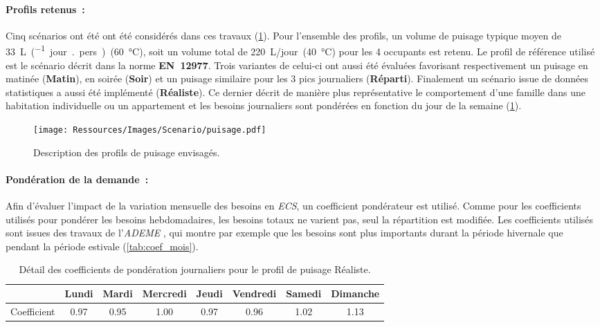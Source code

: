 \paragraph{Profils retenus~:} %
\label{par:profils_retenus}
Cinq scénarios ont été ont été considérés dans ces travaux (\ref{fig:profil_puisage}). Pour
l’ensemble des profils, un volume de puisage typique moyen de
\SI{33}{\liter\per(jour {.} pers)}~(\SI{60}{\celsius}), soit un
volume total de \SI{220}{\liter/jour}~(\SI{40}{\celsius}) pour les 4 occupants est
retenu. Le profil de référence utilisé est le scénario décrit dans la norme
\textbf{EN~12977}. Trois variantes de celui-ci ont aussi été évaluées favorisant
respectivement un puisage en matinée (\textbf{Matin}), en soirée (\textbf{Soir}) et un
puisage similaire pour les 3 pics journaliers (\textbf{Réparti}). Finalement un scénario
issue de données statistiques \parencite{ADEME2016} a aussi été implémenté
(\textbf{Réaliste}). Ce dernier décrit de manière plus représentative le comportement
d’une famille dans une habitation individuelle ou un appartement et les besoins
journaliers sont pondérées en fonction du jour de la semaine (\ref{tab:coef_semaine}).
\begin{figure}
    \begin{center}
        \texttt{[image: Ressources/Images/Scenario/puisage.pdf]}
    \end{center}
    \caption{Description des profils de puisage envisagés.
             \label{fig:profil_puisage}}
\end{figure}

\paragraph{Pondération de la demande~:} %
\label{par:ponderation_de_la_demande}
Afin d’évaluer l’impact de la variation mensuelle des besoins en \emph{ECS}, un
coefficient pondérateur est utilisé. Comme pour les coefficients utilisés pour pondérer
les besoins hebdomadaires, les besoins totaux ne varient pas, seul la répartition est
modifiée. Les coefficients utilisés sont issues des travaux de l’\textit{ADEME}
\parencite{ADEME2016}, qui montre par exemple que les besoins sont plus importants durant
la période hivernale que pendant la période estivale (\ref{tab:coef_mois}).

\begin{table}
\centering
\begin{tabular}{l*{7}{c}}
    \toprule
                & Lundi & Mardi & Mercredi & Jeudi & Vendredi & Samedi & Dimanche \\
    \midrule
    Coefficient & 0.97  & 0.95  & 1.00     & 0.97  & 0.96     & 1.02   & 1.13     \\
    \bottomrule
\end{tabular}
\caption{Détail des coefficients de pondération journaliers pour le profil de
         puisage Réaliste.}
         \label{tab:coef_semaine}
\end{table}


